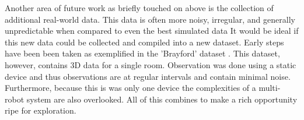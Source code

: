     Another area of future work as briefly touched on above is the collection
    of additional real-world data. This data is often more noisy, irregular,
    and generally unpredictable when compared to even the best simulated data
    It would be ideal if this new data could be collected and compiled into a
    new dataset. Early steps have been been taken as exemplified in the
    'Brayford' dataset \cite{Krajnik2014}. This dataset, however, contains
    3D data for a single room. Observation was done using a static device and
    thus observations are at regular intervals and contain minimal noise.
    Furthermore, because this is was only one device the complexities of a
    multi-robot system are also overlooked. All of this combines to make a
    rich opportunity ripe for exploration.


